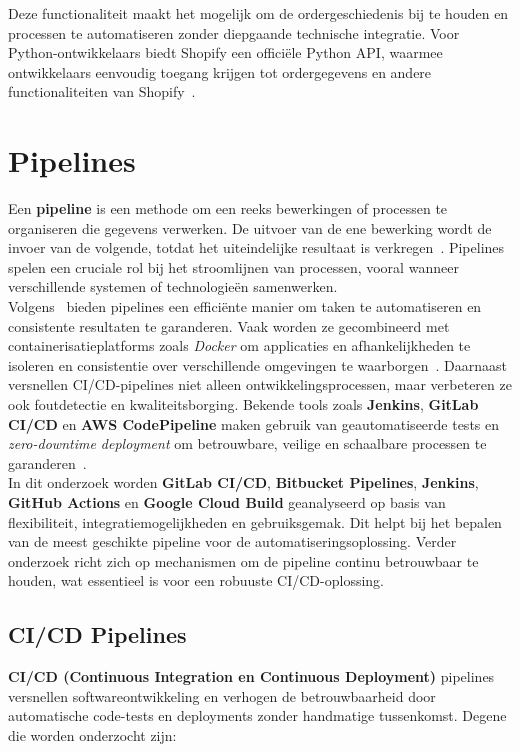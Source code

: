 Deze functionaliteit maakt het mogelijk om de ordergeschiedenis bij te houden en processen te automatiseren zonder diepgaande technische integratie. Voor Python-ontwikkelaars biedt Shopify een officiële Python API, waarmee ontwikkelaars eenvoudig toegang krijgen tot ordergegevens en andere functionaliteiten van Shopify~\cite{shopifyPythonAPI}.

\newpage

\section{Pipelines}%
\label{sec:pipelines}

Een \textbf{pipeline} is een methode om een reeks bewerkingen of processen te organiseren die gegevens verwerken. De uitvoer van de ene bewerking wordt de invoer van de volgende, totdat het uiteindelijke resultaat is verkregen~\autocite{pythonPipelinesThakur}. Pipelines spelen een cruciale rol bij het stroomlijnen van processen, vooral wanneer verschillende systemen of technologieën samenwerken.\\

Volgens~\autocite{thesusVirtanen} bieden pipelines een efficiënte manier om taken te automatiseren en consistente resultaten te garanderen. Vaak worden ze gecombineerd met containerisatieplatforms zoals \textit{Docker} om applicaties en afhankelijkheden te isoleren en consistentie over verschillende omgevingen te waarborgen~\autocite{ijrasetCICDPipeline}. Daarnaast versnellen CI/CD-pipelines niet alleen ontwikkelingsprocessen, maar verbeteren ze ook foutdetectie en kwaliteitsborging. Bekende tools zoals \textbf{Jenkins}, \textbf{GitLab CI/CD} en \textbf{AWS CodePipeline} maken gebruik van geautomatiseerde tests en \textit{zero-downtime deployment} om betrouwbare, veilige en schaalbare processen te garanderen~\autocite{ijrasetFileServe}.\\

In dit onderzoek worden \textbf{GitLab CI/CD}, \textbf{Bitbucket Pipelines}, \textbf{Jenkins}, \textbf{GitHub Actions} en \textbf{Google Cloud Build} geanalyseerd op basis van flexibiliteit, integratiemogelijkheden en gebruiksgemak. Dit helpt bij het bepalen van de meest geschikte pipeline voor de automatiseringsoplossing. Verder onderzoek richt zich op mechanismen om de pipeline continu betrouwbaar te houden, wat essentieel is voor een robuuste CI/CD-oplossing.

\subsection{CI/CD Pipelines}
\textbf{CI/CD (Continuous Integration en Continuous Deployment)} pipelines versnellen softwareontwikkeling en verhogen de betrouwbaarheid door automatische code-tests en deployments zonder handmatige tussenkomst. Degene die worden onderzocht zijn:

